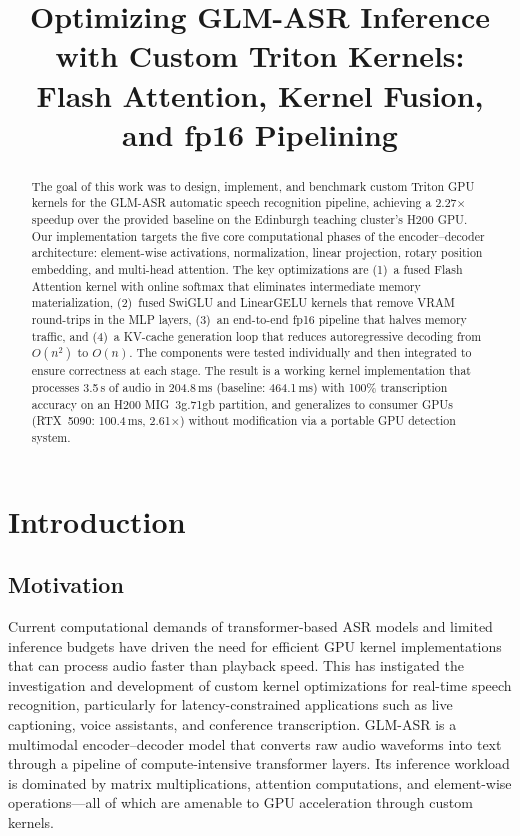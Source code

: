 \documentclass{article}
\title{Optimizing GLM-ASR Inference with Custom Triton Kernels:\\Flash Attention, Kernel Fusion, and fp16 Pipelining}
\begin{document}
\maketitle

\begin{abstract}
The goal of this work was to design, implement, and benchmark custom Triton GPU kernels for the GLM-ASR automatic speech recognition pipeline, achieving a 2.27$\times$ speedup over the provided baseline on the Edinburgh teaching cluster's H200 GPU.
Our implementation targets the five core computational phases of the encoder--decoder architecture: element-wise activations, normalization, linear projection, rotary position embedding, and multi-head attention.
The key optimizations are (1)~a fused Flash Attention kernel with online softmax that eliminates intermediate memory materialization, (2)~fused SwiGLU and LinearGELU kernels that remove VRAM round-trips in the MLP layers, (3)~an end-to-end fp16 pipeline that halves memory traffic, and (4)~a KV-cache generation loop that reduces autoregressive decoding from $O(n^2)$ to $O(n)$.
The components were tested individually and then integrated to ensure correctness at each stage.
The result is a working kernel implementation that processes 3.5\,s of audio in 204.8\,ms (baseline: 464.1\,ms) with 100\% transcription accuracy on an H200 MIG~3g.71gb partition, and generalizes to consumer GPUs (RTX~5090: 100.4\,ms, 2.61$\times$) without modification via a portable GPU detection system.
\end{abstract}

\section{Introduction}\label{sec:motivation}

\subsection{Motivation}

Current computational demands of transformer-based ASR models and limited inference budgets have driven the need for efficient GPU kernel implementations that can process audio faster than playback speed.
This has instigated the investigation and development of custom kernel optimizations for real-time speech recognition, particularly for latency-constrained applications such as live captioning, voice assistants, and conference transcription.
GLM-ASR is a multimodal encoder--decoder model that converts raw audio waveforms into text through a pipeline of compute-intensive transformer layers.
Its inference workload is dominated by matrix multiplications, attention computations, and element-wise operations---all of which are amenable to GPU acceleration through custom kernels.
\end{document}
